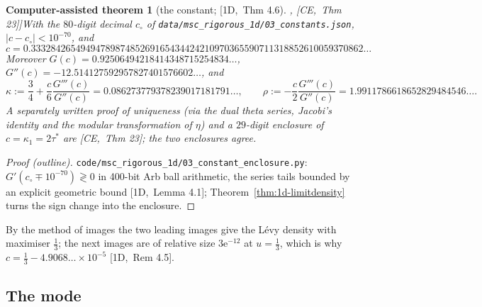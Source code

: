\documentclass[10pt,a4paper]{article}
\theoremstyle{plain}
\newtheorem{catheorem}[theorem]{Computer-assisted theorem}
\theoremstyle{definition}
\newcommand{\src}[2]{[\textsf{#1},~#2]}           %
\newcommand{\ONE}{\textsf{1D}}
\newcommand{\CER}{\textsf{CE}}
\newcommand{\ee}{\mathrm{e}}
\begin{document}
\begin{catheorem}[the constant; \src{\ONE}{Thm 4.6}, \src{\CER}{Thm 23}]\label{thm:1d-constant}
With the $80$-digit decimal $c_\circ$ of \texttt{data/msc\_rigorous\_1d/03\_constants.json}, $|c-c_\circ|<10^{-70}$, and
\[
c=0.3332842654949478987485269165434424210970365590711318852610059370862\ldots
\]
Moreover $G(c)=0.92506494218414348715254834\ldots$, $G''(c)=-12.514127592957827401576602\ldots$, and
\[
\kappa:=\frac34+\frac c6\frac{G'''(c)}{G''(c)}=0.086273779378239017181791\ldots,\qquad \rho:=-\frac c2\frac{G'''(c)}{G''(c)}=1.9911786618652829484546\ldots .
\]
A separately written proof of uniqueness (via the dual theta series, Jacobi's identity and the modular transformation of $\eta$) and a $29$-digit enclosure of $c=\kappa_1=2\tau^*$ are \src{\CER}{Thm 23}; the two enclosures agree.
\end{catheorem}
\begin{proof}[Proof (outline)]
\texttt{code/msc\_rigorous\_1d/03\_constant\_enclosure.py}: $G'(c_\circ\mp10^{-70})\gtrless0$ in 400-bit Arb ball arithmetic, the series tails bounded by an explicit geometric bound \src{\ONE}{Lemma 4.1}; Theorem~\ref{thm:1d-limitdensity} turns the sign change into the enclosure.
\end{proof}
By the method of images the two leading images give the L\'evy density with maximiser $\frac13$; the next images are of relative size $3\ee^{-12}$ at $u=\frac13$, which is why $c=\frac13-4.9068\ldots\times10^{-5}$ \src{\ONE}{Rem 4.5}.

\subsection{The mode}
\end{document}
